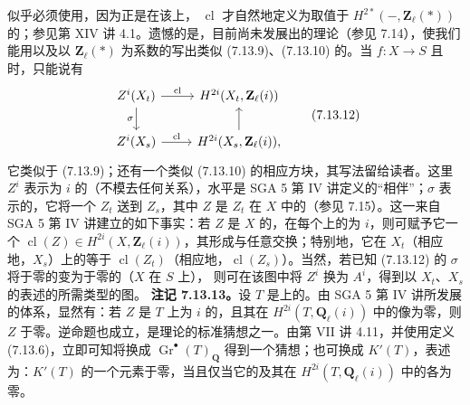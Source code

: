 似乎必须使用，因为正是在该上， $\operatorname{cl}$ 才自然地定义为取值于 $H^{2*}(-,\mathbf Z_\ell(*))$ 的；参见第 XIV 讲 4.1。遗憾的是，目前尚未发展出的理论（参见 7.14），使我们能用以及以 $\mathbf Z_\ell(*)$ 为系数的写出类似 (7.13.9)、(7.13.10) 的。当 $f:X\to S$ 且时，只能说有
\[\begin{tikzcd}Z^i(X_t)\arrow[r,"\operatorname{cl}"]\arrow[d,"\sigma"']&H^{2i}(X_t,\mathbf Z_\ell(i))\\Z^i(X_s)\arrow[r,"\operatorname{cl}"]&H^{2i}(X_s,\mathbf Z_\ell(i))\arrow[u] ,\end{tikzcd}\tag{7.13.12}\]
它类似于 (7.13.9)；还有一个类似 (7.13.10) 的相应方块，其写法留给读者。这里 $Z^i$ 表示为 $i$ 的（不模去任何关系），水平是 SGA 5 第 IV 讲定义的“相伴”；$\sigma$ 表示的，它将一个 $Z_t$ 送到 $Z_s$，其中 $Z$ 是 $Z_t$ 在 $X$ 中的（参见 7.15）。这一来自 SGA 5 第 IV 讲建立的如下事实：若 $Z$ 是 $X$ 的，在每个上的为 $i$，则可赋予它一个 $\operatorname{cl}(Z)\in H^{2i}(X,\mathbf Z_\ell(i))$，其形成与任意交换；特别地，它在 $X_t$（相应地，$X_s$）上的等于 $\operatorname{cl}(Z_t)$（相应地，$\operatorname{cl}(Z_s)$）。当然，若已知 (7.13.12) 的 $\sigma$ 将于零的变为于零的（$X$ 在 $S$ 上），
则可在该图中将 $Z^i$ 换为 $A^i$，得到以 $X_t$、$X_s$ 的表述的所需类型的图。
\textbf{注记 7.13.13。}设 $T$ 是上的。由 SGA 5 第 IV 讲所发展的体系，显然有：若 $Z$ 是 $T$ 上为 $i$ 的，且其在 $H^{2i}(T,\mathbf Q_\ell(i))$ 中的像为零，则 $Z$ 于零。逆命题也成立，是理论的标准猜想之一。由第 VII 讲 4.11，并使用定义 (7.13.6)，立即可知将换成 $\operatorname{Gr}^{\bullet}(T)_{\mathbf Q}$ 得到一个猜想；也可换成 $K'(T)$，表述为：$K'(T)$ 的一个元素于零，当且仅当它的及其在 $H^{2i}(T,\mathbf Q_\ell(i))$ 中的各为零。

